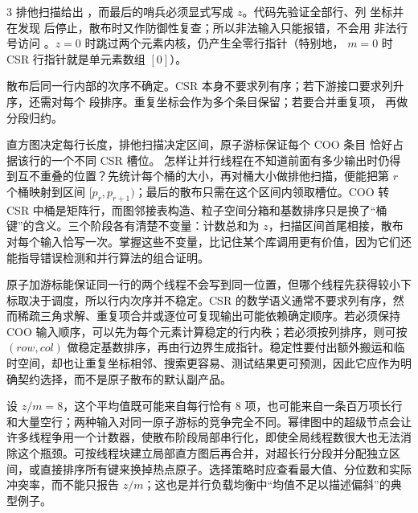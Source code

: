 \begin{solutionexercise}{3}
排他扫描给出 ，而最后的哨兵必须显式写成 $z$。代码先验证全部行、列
坐标并在发现  后停止，散布时又作防御性复查；所以非法输入只能报错，不会用
非法行号访问 。$z=0$ 时跳过两个元素内核，仍产生全零行指针（特别地，
$m=0$ 时 CSR 行指针就是单元素数组 $[0]$）。

散布后同一行内部的次序不确定。CSR 本身不要求列有序；若下游接口要求列升序，还需对每个
 段排序。重复坐标会作为多个条目保留；若要合并重复项，
再做分段归约。

\conclusionheading 直方图决定每行长度，排他扫描决定区间，原子游标保证每个 COO 条目
恰好占据该行的一个不同 CSR 槽位。
\discussionheading
{}
怎样让并行线程在不知道前面有多少输出时仍得到互不重叠的位置？先统计每个桶的大小，再对桶大小做排他扫描，便能把第 $r$ 个桶映射到区间 $[p_r,p_{r+1})$；最后的散布只需在这个区间内领取槽位。COO 转 CSR 中桶是矩阵行，而图邻接表构造、粒子空间分箱和基数排序只是换了“桶键”的含义。三个阶段各有清楚不变量：计数总和为 $z$，扫描区间首尾相接，散布对每个输入恰写一次。掌握这些不变量，比记住某个库调用更有价值，因为它们还能指导错误检测和并行算法的组合证明。

原子加游标能保证同一行的两个线程不会写到同一位置，但哪个线程先获得较小下标取决于调度，所以行内次序并不稳定。CSR 的数学语义通常不要求列有序，然而稀疏三角求解、重复项合并或逐位可复现输出可能依赖确定顺序。若必须保持 COO 输入顺序，可以先为每个元素计算稳定的行内秩；若必须按列排序，则可按 $(row,col)$ 做稳定基数排序，再由行边界生成指针。稳定性要付出额外搬运和临时空间，却也让重复坐标相邻、搜索更容易、测试结果更可预测，因此它应作为明确契约选择，而不是原子散布的默认副产品。

设 $z/m=8$，这个平均值既可能来自每行恰有 8 项，也可能来自一条百万项长行和大量空行；两种输入对同一原子游标的竞争完全不同。幂律图中的超级节点会让许多线程争用一个计数器，使散布阶段局部串行化，即使全局线程数很大也无法消除这个瓶颈。可按线程块建立局部直方图后再合并，对超长行分段并分配独立区间，或直接排序所有键来换掉热点原子。选择策略时应查看最大值、分位数和实际冲突率，而不能只报告 $z/m$；这也是并行负载均衡中“均值不足以描述偏斜”的典型例子。


\end{solutionexercise}
